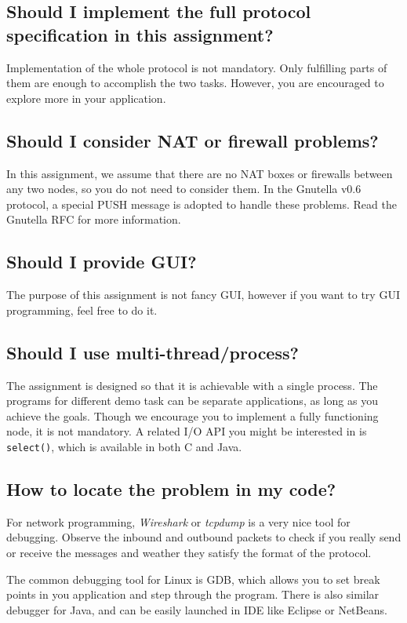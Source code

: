 \documentclass[12pt, a4paper]{article}
\begin{document}
\subsection*{Should I implement the full protocol specification in this assignment?}
Implementation of the whole protocol is not mandatory.
Only fulfilling parts of them are enough to accomplish the two tasks.
However, you are encouraged to explore more in your application.

\subsection*{Should I consider NAT or firewall problems?}
In this assignment, we assume that there are no NAT boxes or firewalls between any two nodes, so you do not need to consider them.
In the Gnutella v0.6 protocol, a special PUSH message is adopted to handle these problems.
Read the Gnutella RFC for more information.

\subsection*{Should I provide GUI?}
The purpose of this assignment is not fancy GUI, however if you want to try GUI programming, feel free to do it.

\subsection*{Should I use multi-thread/process?}
The assignment is designed so that it is achievable with a single process.
The programs for different demo task can be separate applications, as long as you achieve the goals.
Though we encourage you to implement a fully functioning node, it is not mandatory.
A related I/O API you might be interested in is \texttt{select()}, which is available in both C and Java.

\subsection*{How to locate the problem in my code?}
For network programming, \emph{Wireshark} or \emph{tcpdump} is a very nice tool for debugging.
Observe the inbound and outbound packets to check if you really send or receive the messages and weather they satisfy the format of the protocol.

The common debugging tool for Linux is GDB, which allows you to set break points in you application and step through the program.
There is also similar debugger for Java, and can be easily launched in IDE like Eclipse or NetBeans.
\end{document}
